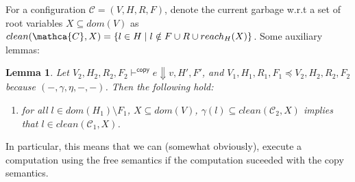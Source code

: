 \documentclass[11pt]{article}
\newtheorem{lemma}[theorem]{Lemma}
\theoremstyle{definition}
\begin{document}
For a configuration $\mathcal{C} = (V,H,R,F)$, denote the current garbage w.r.t a set of root variables 
$X \subseteq dom(V)$ 
as $clean(\mathca{C},X) = \{l \in H \mid l \notin F \cup R \cup reach_H(X)\}$. Some auxiliary lemmas: 

\begin{lemma}\label{itm:aux}
Let $V_2,H_2,R_2,F_2 \vdash^{\mathsf{copy}} e \Downarrow v,H',F'$, and 
$V_1,H_1,R_1,F_1 \preceq V_2,H_2,R_2,F_2$ because $(-,\gamma,\eta,-,-)$. Then the following hold:
\begin{enumerate}
\item for all $l \in dom(H_1) \setminus F_1$, 
$X \subseteq dom(V)$, $\gamma(l) \subseteq clean(\mathcal{C}_2,X)$ implies that 
$l \in clean(\mathcal{C}_1,X)$.
\end{enumerate}
\end{lemma}
In particular, this means that we can (somewhat obviously), execute a computation using the free semantics
if the computation suceeded with the copy semantics. 
\end{document}
